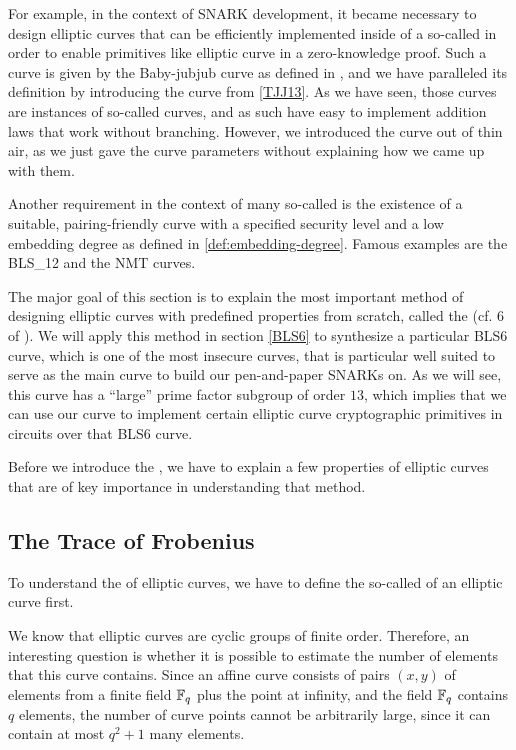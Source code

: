 For example, in the context of SNARK development, it became necessary to design elliptic curves that can be efficiently implemented inside of a so-called  in order to enable primitives like elliptic curve  in a zero-knowledge proof. Such a curve is given by the Baby-jubjub curve as defined in \cite{whitehat-21}, and we have paralleled its definition by introducing the  curve from \examplename{} \ref{TJJ13}. As we have seen, those curves are instances of so-called  curves, and as such have easy to implement addition laws that work without branching. However, we introduced the  curve out of thin air, as we just gave the curve parameters without explaining how we came up with them.

Another requirement in the context of many so-called  is the existence of a suitable, pairing-friendly curve with a specified security level and a low embedding degree as defined in \ref{def:embedding-degree}. Famous examples are the BLS\_12 and the NMT curves.

The major goal of this section is to explain the most important method of designing elliptic curves with predefined properties from scratch, called the  (cf. \chaptname{} 6 of \cite{silverman-1994}). We will apply this method in section \ref{BLS6} to synthesize a particular BLS6 curve, which is one of the most insecure curves, that is particular well suited to serve  as the main curve to build our pen-and-paper SNARKs on. As we will see, this curve has a ``large'' prime factor subgroup of order $13$, which implies that we can use our  curve to implement certain elliptic curve cryptographic primitives in circuits over that BLS6 curve. 
 
Before we introduce the , we have to explain a few properties of elliptic curves that are of key importance in understanding that method. 

\subsection{The Trace of Frobenius} To understand the  of elliptic curves, we have to define the so-called  of an elliptic curve first.

We know that elliptic curves are cyclic groups of finite order. Therefore, an interesting question is whether it is possible to estimate the number of elements that this curve contains. Since an affine  curve consists of pairs $(x,y)$ of elements from a finite field $\mathbb{F}_q$ plus the point at infinity, and the field $\mathbb{F}_q$ contains $q$ elements, the number of curve points cannot be arbitrarily large, since it can contain at most $q^2+1$ many elements. 


